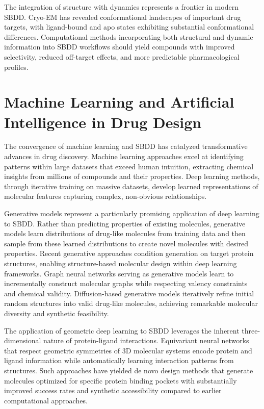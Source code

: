 \documentclass[12pt,a4paper]{article}
\begin{document}
The integration of structure with dynamics represents a frontier in modern SBDD. Cryo-EM has revealed conformational landscapes of important drug targets, with ligand-bound and apo states exhibiting substantial conformational differences. Computational methods incorporating both structural and dynamic information into SBDD workflows should yield compounds with improved selectivity, reduced off-target effects, and more predictable pharmacological profiles.

\section*{Machine Learning and Artificial Intelligence in Drug Design}

The convergence of machine learning and SBDD has catalyzed transformative advances in drug discovery. Machine learning approaches excel at identifying patterns within large datasets that exceed human intuition, extracting chemical insights from millions of compounds and their properties. Deep learning methods, through iterative training on massive datasets, develop learned representations of molecular features capturing complex, non-obvious relationships.

Generative models represent a particularly promising application of deep learning to SBDD. Rather than predicting properties of existing molecules, generative models learn distributions of drug-like molecules from training data and then sample from these learned distributions to create novel molecules with desired properties. Recent generative approaches condition generation on target protein structures, enabling structure-based molecular design within deep learning frameworks. Graph neural networks serving as generative models learn to incrementally construct molecular graphs while respecting valency constraints and chemical validity. Diffusion-based generative models iteratively refine initial random structures into valid drug-like molecules, achieving remarkable molecular diversity and synthetic feasibility.

The application of geometric deep learning to SBDD leverages the inherent three-dimensional nature of protein-ligand interactions. Equivariant neural networks that respect geometric symmetries of 3D molecular systems encode protein and ligand information while automatically learning interaction patterns from structures. Such approaches have yielded de novo design methods that generate molecules optimized for specific protein binding pockets with substantially improved success rates and synthetic accessibility compared to earlier computational approaches.
\end{document}
